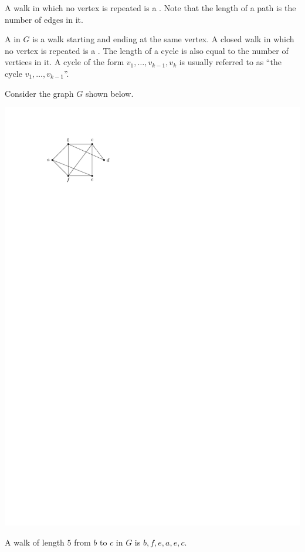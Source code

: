 A walk in which no vertex is repeated is a . Note that the length of a path is the number of edges in it.

A  in $G$ is a walk starting and ending at the same vertex. A closed walk in which no vertex is repeated is a . The length of a cycle is also equal to the number of vertices in it. A cycle of the form $v_1, \ldots, v_{k-1}, v_k$ is usually referred to as ``the cycle $v_1, \ldots, v_{k-1}$''.

\begin{Example}\label{ex:Walk}
Consider the graph $G$ shown below.

\begin{center}
\includegraphics{Walks.pdf}
\end{center}
A walk of length $5$ from $b$ to $c$ in $G$ is $b, f, e, a, e, c$.


\end{Example}
